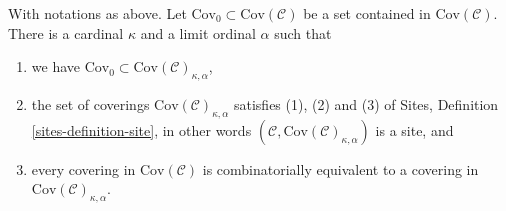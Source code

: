 \begin{lemma}
\label{lemma-coverings-site}
With notations as above.
Let $\text{Cov}_0 \subset \text{Cov}(\mathcal{C})$
be a set contained in $\text{Cov}(\mathcal{C})$.
There is a cardinal $\kappa$ and a limit ordinal $\alpha$ such that
\begin{enumerate}
\item we have $\text{Cov}_0 \subset \text{Cov}(\mathcal{C})_{\kappa, \alpha}$,
\item the set of coverings
$\text{Cov}(\mathcal{C})_{\kappa, \alpha}$ satisfies
(1), (2) and (3) of Sites, Definition \ref{sites-definition-site},
in other words $(\mathcal{C}, \text{Cov}(\mathcal{C})_{\kappa, \alpha})$
is a site, and
\item every covering in $\text{Cov}(\mathcal{C})$
is combinatorially equivalent
to a covering in $\text{Cov}(\mathcal{C})_{\kappa, \alpha}$.
\end{enumerate}
\end{lemma}

